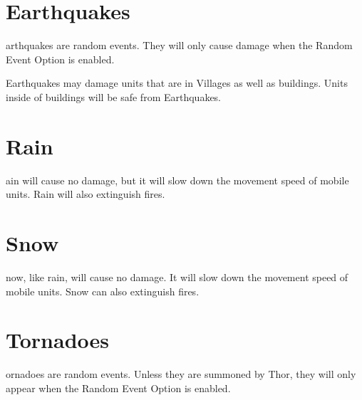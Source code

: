 \section{Earthquakes}


arthquakes are random events. They will only cause damage when the Random Event Option is enabled.

Earthquakes may damage units that are in Villages as well as buildings. Units inside of buildings will be safe from Earthquakes.

\section{Rain}


ain will cause no damage, but it will slow down the movement speed of mobile units. Rain will also extinguish fires.

\section{Snow}


now, like rain, will cause no damage. It will slow down the movement speed of mobile units. Snow can also extinguish fires.

\section{Tornadoes}


ornadoes are random events. Unless they are summoned by Thor, they will only appear when the Random Event Option is enabled.